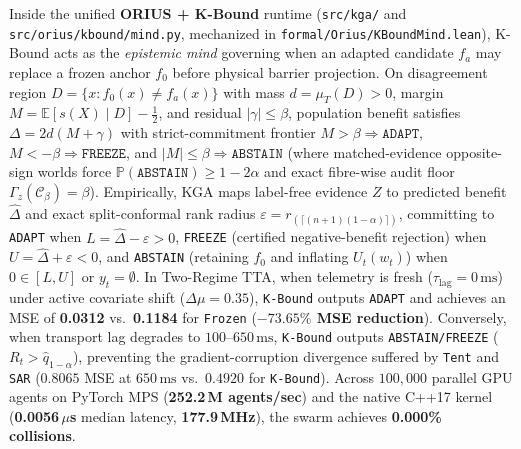 \documentclass[conference]{IEEEtran}
\begin{document}
Inside the unified \textbf{ORIUS + K-Bound} runtime (\texttt{src/kga/} and \texttt{src/orius/\allowbreak kbound/\allowbreak mind.py}, mechanized in \texttt{formal/Orius/\allowbreak KBoundMind.lean}), K-Bound acts as the \emph{epistemic mind} governing when an adapted candidate $f_a$ may replace a frozen anchor $f_0$ before physical barrier projection. On disagreement region $D = \{x : f_0(x)\ne f_a(x)\}$ with mass $d=\mu_T(D)>0$, margin $M = \mathbb{E}[s(X)\mid D]-\frac{1}{2}$, and residual $|\gamma|\le \beta$, population benefit satisfies $\Delta = 2d(M+\gamma)$ with strict-commitment frontier $M>\beta \Rightarrow \texttt{ADAPT}$, $M<-\beta \Rightarrow \texttt{FREEZE}$, and $|M|\le \beta \Rightarrow \texttt{ABSTAIN}$ (where matched-evidence opposite-sign worlds force $\mathbb{P}(\texttt{ABSTAIN})\ge 1-2\alpha$ and exact fibre-wise audit floor $\Gamma_z(\mathcal{C}_\beta)=\beta$). Empirically, KGA maps label-free evidence $Z$ to predicted benefit $\hat{\Delta}$ and exact split-conformal rank radius $\varepsilon = r_{(\lceil (n+1)(1-\alpha)\rceil)}$, committing to \texttt{ADAPT} when $L=\hat{\Delta}-\varepsilon>0$, \texttt{FREEZE} (certified negative-benefit rejection) when $U=\hat{\Delta}+\varepsilon<0$, and \texttt{ABSTAIN} (retaining $f_0$ and inflating $U_t(w_t)$) when $0\in[L,U]$ or $y_t=\emptyset$. In Two-Regime TTA, when telemetry is fresh ($\tau_{\mathrm{lag}}=0\,\text{ms}$) under active covariate shift ($\Delta\mu=0.35$), \texttt{K-Bound} outputs \texttt{ADAPT} and achieves an MSE of \textbf{0.0312} vs.\ \textbf{0.1184} for \texttt{Frozen} (\textbf{$-73.65\%$ MSE reduction}). Conversely, when transport lag degrades to $100$--$650\,\text{ms}$, \texttt{K-Bound} outputs \texttt{ABSTAIN/FREEZE} ($R_t > \hat{q}_{1-\alpha}$), preventing the gradient-corruption divergence suffered by \texttt{Tent} \cite{wang_tent_2021} and \texttt{SAR} \cite{niu_sar_2023} ($0.8065$ MSE at $650\,\text{ms}$ vs.\ $0.4920$ for \texttt{K-Bound}). Across $100,000$ parallel GPU agents on PyTorch MPS (\textbf{252.2\,M agents/sec}) and the native C++17 kernel (\textbf{0.0056\,$\mu$s} median latency, \textbf{177.9\,MHz}), the swarm achieves \textbf{0.000\% collisions}.
\end{document}

